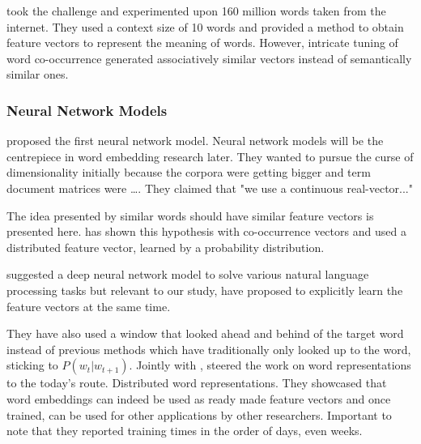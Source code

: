 \textcite{lund_producing_1996} took the challenge and experimented upon 160 million words taken from the internet.
They used a context size of 10 words and provided a method to obtain feature vectors to represent the meaning of words.
However, intricate tuning of word co-occurrence generated associatively similar vectors instead of semantically similar ones.

\subsubsection{Neural Network Models}%
\label{ssub:neural_network_models}

\textcite{bengio_neural_2000} proposed the first neural network model.
Neural network models will be the centrepiece in word embedding research later.
They wanted to pursue the curse of dimensionality initially because the corpora were getting bigger and term document matrices were \ldots.
They claimed that "we use a continuous real-vector..."

The idea presented by \citeauthor{lund_producing_1996} similar words should have similar feature vectors is presented here.
\citeauthor{lund_producing_1996} has shown this hypothesis with co-occurrence vectors and \citeauthor{bengio_neural_2000} used a distributed feature vector, learned by a probability distribution.

\citeauthor{collobert_unified_2008} suggested a deep neural network model to solve various natural language processing tasks but relevant to our study, have proposed to explicitly learn the feature vectors at the same time.

They have also used a window that looked ahead and behind of the target word instead of previous methods which have traditionally only looked up to the word, sticking to $P(w_t | w_{t+1})$.
Jointly with \citeauthor{collobert_unified_2008}, \citeauthor{p._turian_word_2010} steered the work on word representations to the today's route.
Distributed word representations.
They showcased that word embeddings can indeed be used as ready made feature vectors and once trained, can be used for other applications by other researchers.
Important to note that they reported training times in the order of days, even weeks.

